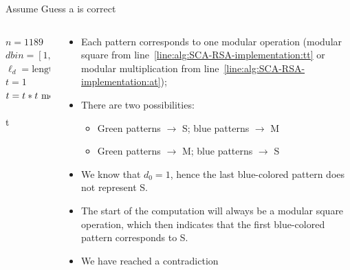 \begin{frame}{Assume Guess a is correct}
   \begin{columns}[T] %
\begin{column}{.48\textwidth}
{
\setlength{\interspacetitleruled}{0pt}%
\setlength{\algotitleheightrule}{0pt}%
\begin{algorithm}[H]
$n=1189$\\
$dbin=[1,1,0,1,0,1,1,1,0,1]$\\
$\ell_d=\text{length of }dbin$\\
$t = 1$\\
 	{
  	$t=t*t\textrm{~mod~} n$\label{line:alg:SCA-RSA-implementation:tt}\\
  	}
  	\Return t
\end{algorithm}
}
\end{column}%
\hfill%
\begin{column}{.57\textwidth}
\begin{itemize}
    \item[Guess a] Each pattern corresponds to one modular operation (modular square from line~\ref{line:alg:SCA-RSA-implementation:tt} or modular multiplication from line~\ref{line:alg:SCA-RSA-implementation:at});
   \item There are two possibilities:
\begin{itemize}
    \item Green patterns $\rightarrow$ S; blue patterns $\rightarrow$ M 
    \item Green patterns $\rightarrow$ M; blue patterns $\rightarrow$ S 
\end{itemize}
    \item We know that $d_0=1$, hence the last blue-colored pattern does not represent S.
     \item The start of the computation will always be a modular square operation, which then indicates that the first blue-colored pattern corresponds to S.
     \item We have reached a contradiction
\end{itemize}
\end{column}%
\end{columns} 
\end{frame}

